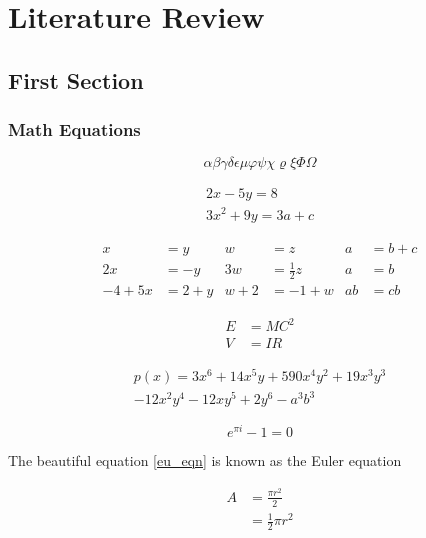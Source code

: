 \chapter{Literature Review}
\lipsum[1-10]
\section{First Section}
\lipsum[1-10]
\subsection{Math Equations}

\begin{equation}
\alpha\beta\gamma\delta\epsilon\mu\varphi\psi\chi\varrho\xi\Phi\Omega
\end{equation}

\begin{gather*} 
2x - 5y =  8 \\ 
3x^2 + 9y =  3a + c
\end{gather*}

\begin{align*}
x&=y           &  w &=z              &  a&=b+c\\
2x&=-y         &  3w&=\frac{1}{2}z   &  a&=b\\
-4 + 5x&=2+y   &  w+2&=-1+w          &  ab&=cb
\end{align*}

\begin{align} 
E &=MC^2 \\
V &=IR
\end{align}%
%
%


\begin{multline*}
p(x) = 3x^6 + 14x^5y + 590x^4y^2 + 19x^3y^3\\ 
- 12x^2y^4 - 12xy^5 + 2y^6 - a^3b^3
\end{multline*}

\begin{equation} \label{eu_eqn}
e^{\pi i} - 1 = 0
\end{equation}
 
The beautiful equation \ref{eu_eqn} is known as the Euler equation

\begin{equation} \label{eq1}
\begin{split}
A & = \frac{\pi r^2}{2} \\
 & = \frac{1}{2} \pi r^2
\end{split}
\end{equation}

